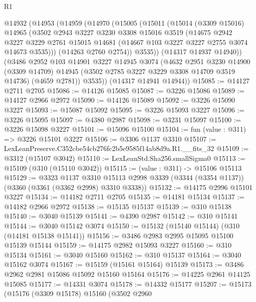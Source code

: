 \begin{lexlean}{R1}
\begin{coremodule}
  @14932
    (@14953
      (@14959
        (@14970
          (@15005
            (@15011
              (@15014
                (@3309 @15016)
                @14965
                (@3502
                  @2943
                  @3227
                  @3230
                  @3308
                  @15016
                  @3519
                  (@14675
                    @2942
                    @3227
                    @3229
                    @2761
                    @15015
                    @14681
                    (@14667 @103 @3227 @3227 @2755 @3074 @14673 @3535)))
                (@14263 @2760 @2754))
              @3535))
          (@14317 @14937 @14940))
        (@3486
          @2952
          @103
          @14901
          @3227
          @14945
          @3074
          (@4632
            @2951
            @3230
            @14900
            (@3309 @14709)
            @14945
            (@3502 @2785 @3227 @3229 @3308 @14709 @3519 @14736)
            (@4659 @2781))
          @3535))
      (@14317 @14941 @14944))
@15085 := @14127 @2711 @2705
@15086 := @14126 @15085
@15087 := @3226 @15086
@15089 := @14127 @2966 @2972
@15090 := @14126 @15089
@15092 := @3226 @15090 @3227
@15093 := @15087 @15092
@15095 := @3226 @15093 @3227
@15096 := @3226 @15095
@15097 := @4380 @2987
@15098 := @3231 @15097
@15100 := @3226 @15098 @3227
@15101 := @15096 @15100
@15104 := fun (value : @311) => @3226 @15101 @3227
@15106 := @3306 @1137 @3310
@15107 := LexLeanPreserve.C352cbe54cb276fc2b5e9585f14ab8d9a.R1.__fits_32
@15109 := @3312 (@15107 @3042)
@15110 := LexLeanStd.Sha256.smallSigma0
@15113 := @15109 (@310 (@15110 @3042))
@15115 := (value : @311) -> @15106 @15113
@15129 := @3323
    @1137
    @3310
    @15113
    @2998
    @3339
    (@3344 (@3354 @1137))
    (@3360 (@3361 (@3362 @2998) @3310 @3338))
@15132 := @14175 @2996 @15101 @3227
@15134 := @14182 @2711 @2705
@15135 := @14181 @15134
@15137 := @14182 @2966 @2972
@15138 := @15135 @15137
@15139 := @310 @15138
@15140 := @3040 @15139
@15141 := @4390 @2987
@15142 := @310 @15141
@15144 := @3040 @15142 @3074
@15150 := @15132 (@15140 @15144) (@310 (@14181 @15138 @15141))
@15156 := @3486 @2983 @2995 @15095 @15100 @15139 @15144
@15159 := @14175 @2982 @15093 @3227
@15160 := @310 @15134
@15161 := @3040 @15160
@15162 := @310 @15137
@15164 := @3040 @15162 @3074
@15167 := @15159 (@15161 @15164) @15139
@15173 := @3486 @2962 @2981 @15086 @15092 @15160 @15164
@15176 := @14225 @2961 @14125 @15085
@15177 := @14331 @3074
@15178 := @14332 @15177
@15207 := @15173
    (@15176
      (@3309 @15178)
      @15160
      (@3502
        @2960

\end{coremodule}
\end{lexlean}
